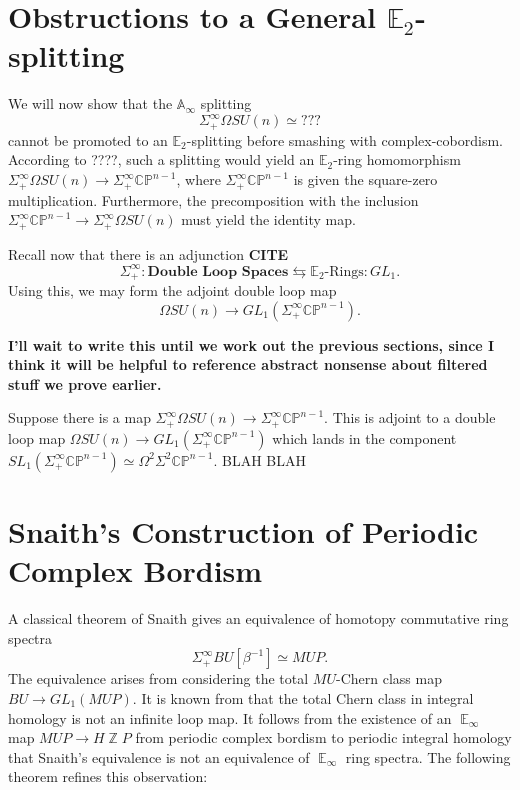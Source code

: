 \documentclass[reqno, oneside]{amsart}
\theoremstyle{definition}
\theoremstyle{plain}
\DeclareMathOperator{\Z}{\mathbb{Z}}
\DeclareMathOperator{\E}{\mathbb{E}}
\begin{document}
\section{Obstructions to a General \texorpdfstring{$\mathbb{E}_2$}{E2}-splitting}

We will now show that the $\mathbb{A}_\infty$ splitting $$\Sigma^{\infty}_+ \Omega SU(n) \simeq ???$$ cannot be promoted to an $\mathbb{E}_2$-splitting before smashing with complex-cobordism.  According to ????, such a splitting would yield an $\mathbb{E}_2$-ring homomorphism $\Sigma^{\infty}_+ \Omega SU(n) \rightarrow \Sigma^{\infty}_+ \mathbb{CP}^{n-1}$, where $\Sigma^{\infty}_+ \mathbb{CP}^{n-1}$ is given the square-zero multiplication.  Furthermore, the precomposition with the inclusion $\Sigma^{\infty}_+ \mathbb{CP}^{n-1} \longrightarrow \Sigma^{\infty}_+ \Omega SU(n)$ must yield the identity map.

Recall now that there is an adjunction \textbf{CITE}
$$\Sigma^{\infty}_+:\textbf{Double Loop Spaces} \leftrightarrows \mathbb{E}_2\text{-Rings}:GL_1.$$
Using this, we may form the adjoint double loop map
$$\Omega SU(n) \rightarrow GL_1(\Sigma^{\infty}_+ \mathbb{CP}^{n-1}).$$

\textbf{I'll wait to write this until we work out the previous sections, since I think it will be helpful to reference abstract nonsense about filtered stuff we prove earlier.}

Suppose there is a map $\Sigma^{\infty}_+ \Omega SU(n) \rightarrow \Sigma^{\infty}_+ \mathbb{CP}^{n-1}$.  This is adjoint to a double loop map $\Omega SU(n) \rightarrow GL_1(\Sigma^{\infty}_+\mathbb{CP}^{n-1})$ which lands in the component $SL_1(\Sigma^{\infty}_+ \mathbb{CP}^{n-1}) \simeq \Omega^2 \Sigma^2 \mathbb{CP}^{n-1}$.  BLAH BLAH

\section{Snaith's Construction of Periodic Complex Bordism} \label{sec:SnaithSplitting}

A classical theorem of Snaith \cite{SnaithOriginal} gives an equivalence of homotopy commutative ring spectra $$\Sigma^{\infty}_+ BU [\beta^{-1}] \simeq MUP.$$  The equivalence arises from considering the total $MU$-Chern class map $BU \to GL_1(MUP).$  It is known from \cite{SnaithNotMultiplicative} that the total Chern class in integral homology is not an infinite loop map.  It follows from the existence of an $\E_\infty$ map $MUP \to H\Z P$ from periodic complex bordism to periodic integral homology that Snaith's equivalence is not an equivalence of $\E_\infty$ ring spectra.  The following theorem refines this observation:
\end{document}
